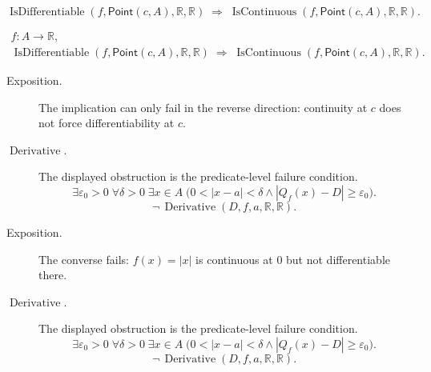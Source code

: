 \begin{remark*}
\[
\operatorname{IsDifferentiable}(f,\mathsf{Point}(c,A),\mathbb R,\mathbb R)
\;\Rightarrow\;
\operatorname{IsContinuous}(f,\mathsf{Point}(c,A),\mathbb R,\mathbb R).
\]
\end{remark*}

\begin{remark*}
\[
\begin{aligned}
  f\colon A\to\mathbb{R},\\
\operatorname{IsDifferentiable}(f,\mathsf{Point}(c,A),\mathbb R,\mathbb R)
\;\Longrightarrow\;
\operatorname{IsContinuous}(f,\mathsf{Point}(c,A),\mathbb R,\mathbb R).
\end{aligned}
\]
\end{remark*}

\begin{remark*}
\begin{description}
  \item[Exposition.]
The implication can only fail in the reverse direction: continuity at $c$
does not force differentiability at $c$.


  \item[\(\operatorname{Derivative}.\)]
  The displayed obstruction is the predicate-level failure condition.
  \[
  \exists\varepsilon_0>0\;\forall\delta>0\;\exists x\in A\;\bigl(0<|x-a|<\delta\land |Q_f(x)-D|\ge\varepsilon_0\bigr).
  \]
  \[
  \neg\,\operatorname{Derivative}(D,f,a,\mathbb{R},\mathbb{R}).
  \]
\end{description}
\end{remark*}

\begin{remark*}
\begin{description}
  \item[Exposition.]
The converse fails: $f(x) = |x|$ is continuous at $0$ but not differentiable there.


  \item[\(\operatorname{Derivative}.\)]
  The displayed obstruction is the predicate-level failure condition.
  \[
  \exists\varepsilon_0>0\;\forall\delta>0\;\exists x\in A\;\bigl(0<|x-a|<\delta\land |Q_f(x)-D|\ge\varepsilon_0\bigr).
  \]
  \[
  \neg\,\operatorname{Derivative}(D,f,a,\mathbb{R},\mathbb{R}).
  \]
\end{description}
\end{remark*}

